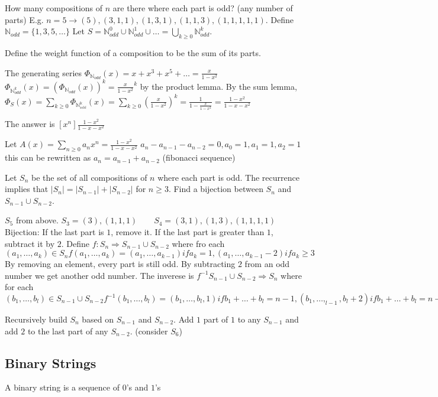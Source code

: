 \documentclass{article}
\begin{document}
\example
How many compositions of $n$ are there where each part is odd? (any number of parts) E.g. $n=5 \rightarrow (5), (3,1,1), (1,3,1), (1,1,3), (1,1,1,1,1)$. Define $\mathbb{N}_{odd} = \{1,3,5, \dots \}$ Let $S = \mathbb{N}_{odd}^0 \cup \mathbb{N}_{odd}^1 \cup \dots = \bigcup_{k \ge 0} \mathbb{N}_{odd}^k$.

Define the weight function of a composition to be the sum of its parts.

The generating series $\Phi_{\mathbb{N}_{odd}}(x) = x + x^3 + x^5 + \dots = \frac{x}{1-x^2}$
$\Phi_{\mathbb{N}_{odd}^k}(x) = \left(\Phi_{\mathbb{N}_{odd}}(x)\right)^k = \frac{x}{1-x^2}^k$ by the product lemma.  
By the sum lemma, $\Phi_S(x) = \sum_{k \ge 0} \Phi_{\mathbb{N_{odd}^k}}(x)  = \sum_{k \ge 0}(\frac{x}{1-x^2})^k = \frac{1}{1-\frac{x}{1-x^2}} = \frac{1-x^2}{1-x-x^2}$

The answer is $[x^n] \frac{1-x^2}{1-x-x^2}$

Let $A(x) = \sum_{n \ge 0}a_nx^n = \frac{1-x^2}{1-x-x^2}$ $a_n - a_{n-1} - a_{n-2} = 0, a_0 = 1, a_1 = 1, a_2 = 1$ this can be rewritten as $a_n = a_{n-1} + a_{n-2}$ (fibonacci sequence)

Let $S_n$ be the set of all compositions of $n$ where each part is odd. The recurrence implies that $|S_n| = |S_{n-1}| + |S_{n-2}|$ for $n \ge 3$. Find a bijection between $S_n$ and $S_{n-1} \cup S_{n-2}$.

$S_5$ from above. $S_3 = (3), (1,1,1) \qquad S_4 = (3,1), (1,3), (1,1,1,1)$ Bijection: If the last part is $1$, remove it. If the last part is greater than $1$, subtract it by $2$.
Define $f: S_n \Rightarrow S_{n-1} \cup S_{n-2}$ where fro each $(a_1, \dots, a_k) \in S_n f(a_1, \dots , a_k) = (a_1, \dots , a_{k-1}) if a_k = 1, (a_1, \dots, a_{k-1}-2) if a_k \ge 3$ %
By removing an element, every part is still odd. By subtracting $2$ from an odd number we get another odd number. The inverese is $f^{-1}S_{n-1} \cup S_{n-2} \Rightarrow S_n$ where for each $(b_1, \dots , b_l) \in S_{n-1} \cup S_{n-2} f^{-1}(b_1, \dots, b_l) = (b_1, \dots, b_l, 1) if b_1 + \dots + b_l = n-1, (b_1, \dots, _{l-1}, b_l+2) if b_1 + \dots + b_l = n-2$ %

Recursively build $S_n$ based on $S_{n-1}$ and $S_{n-2}$. Add $1$ part of $1$ to any $S_{n-1}$ and add $2$ to the last part of any $S_{n-2}$. (consider $S_6$)

\subsection{Binary Strings}
A binary string is a sequence of $0$'s and $1$'s
\end{document}
